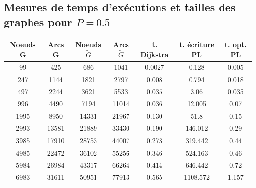 \documentclass{article}
\begin{document}
\begin{appendices}
\subsection{Mesures de temps d'exécutions et tailles des graphes pour $P=0.5$}
\begin{table}[h]
    \centering
\begin{tabular}{c|c|c|c|c|c|c}
Noeuds G & Arcs G & Noeuds $\tilde{G}$ & Arcs $\tilde{G}$ & t. Dijkstra & t. écriture PL & t. opt. PL \\ \hline
99 & 425 & 686 & 1041 & 0.0027 & 0.128 & 0.005 \\
247 & 1144 & 1821 & 2797 & 0.008 & 0.794 & 0.018 \\
497 & 2244 & 3621 & 5533 & 0.035 & 3.06 & 0.035 \\
996 & 4490 & 7194 & 11014 & 0.036 & 12.005 & 0.07 \\
1995 & 8950 & 14331 & 21967 & 0.130 & 51.8 & 0.15 \\
2993 & 13581 & 21889 & 33430 & 0.190 & 146.012 & 0.29 \\
3985 & 17910 & 28753 & 44007 & 0.273 & 319.442 & 0.44 \\
4985 & 22472 & 36102 & 55256 & 0.346 & 524.163 & 0.46 \\
5984 & 26984 & 43317 & 66264 & 0.414 & 646.442 & 0.72 \\
6983 & 31611 & 50951 & 77913 & 0.565 & 1108.572 & 1.157
\end{tabular}
\end{table}
\newpage

\end{appendices}
\end{document}

